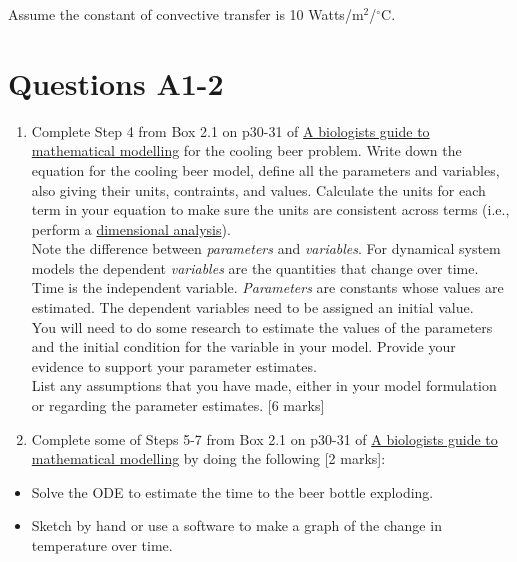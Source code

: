 \documentclass[]{book}
\begin{document}
Assume the constant of convective transfer is 10
Watts/m\(^2\)/\(^\circ\)C.

\section{Questions A1-2}\label{questions-a1-2}

\begin{enumerate}
\def\labelenumi{\arabic{enumi}.}
\setcounter{enumi}{4}
\item
  Complete Step 4 from Box 2.1 on p30-31 of
  \href{https://ebookcentral-proquest-com.qe2a-proxy.mun.ca/lib/MUN/detail.action?docID=768551}{A
  biologists guide to mathematical modelling} for the cooling beer
  problem. Write down the equation for the cooling beer model, define
  all the parameters and variables, also giving their units, contraints,
  and values. Calculate the units for each term in your equation to make
  sure the units are consistent across terms (i.e., perform a
  \href{https://en.wikipedia.org/wiki/Dimensional_analysis}{dimensional
  analysis}).\\[2\baselineskip]Note the difference between
  \emph{parameters} and \emph{variables}. For dynamical system models
  the dependent \emph{variables} are the quantities that change over
  time. Time is the independent variable. \emph{Parameters} are
  constants whose values are estimated. The dependent variables need to
  be assigned an initial value.\\[2\baselineskip]You will need to do
  some research to estimate the values of the parameters and the initial
  condition for the variable in your model. Provide your evidence to
  support your parameter estimates.\\
  List any assumptions that you have made, either in your model
  formulation or regarding the parameter estimates. {[}6 marks{]}
\item
  Complete some of Steps 5-7 from Box 2.1 on p30-31 of
  \href{https://ebookcentral-proquest-com.qe2a-proxy.mun.ca/lib/MUN/detail.action?docID=768551}{A
  biologists guide to mathematical modelling} by doing the following
  {[}2 marks{]}:
\end{enumerate}

\begin{itemize}
\item
  Solve the ODE to estimate the time to the beer bottle exploding.
\item
  Sketch by hand or use a software to make a graph of the change in
  temperature over time.
\end{itemize}
\end{document}
